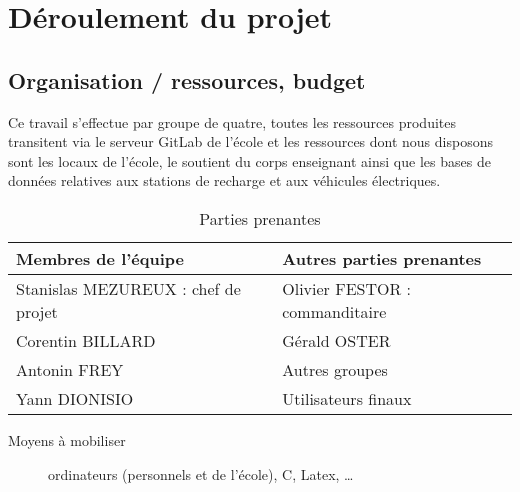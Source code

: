 \documentclass[12pt]{report}
\begin{document}
\section{Déroulement du projet}
    \subsection{Organisation / ressources, budget}
        Ce travail s'effectue par groupe de quatre, toutes les ressources produites transitent via le serveur GitLab de l'école et les ressources dont nous disposons sont les locaux de l'école, le soutient du corps enseignant ainsi que les bases de données relatives aux stations de recharge et aux véhicules électriques.

        \bigskip
        \begin{table}[htbp]
            \centering
            \caption{Parties prenantes}
            \begin{tabular}{|l|l|}
                \hline
                \textbf{Membres de l'équipe} & \textbf{Autres parties prenantes} \\
                \hline\hline
                Stanislas MEZUREUX : chef de projet & Olivier FESTOR : commanditaire \\ 
                Corentin BILLARD &  Gérald OSTER \\
                Antonin FREY &  Autres groupes \\
                Yann DIONISIO &  Utilisateurs finaux\\
                \hline
            \end{tabular}
        \end{table}
        
        
        \begin{description}
            \item[Moyens à mobiliser] ordinateurs (personnels et de l'école), C, Latex, \dots
        \end{description}
    
    \bigskip
\end{document}
